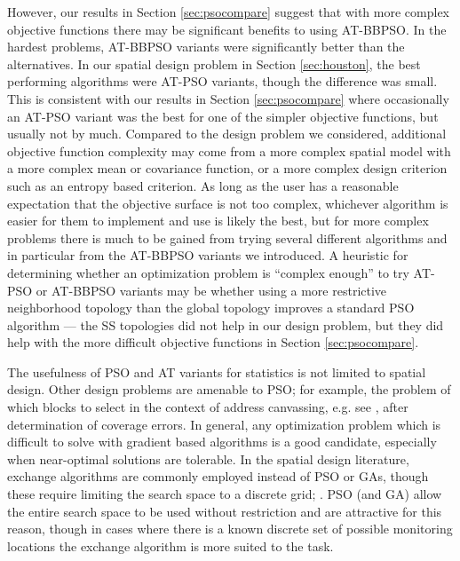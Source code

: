 \documentclass[cmbright]{staauth}
\begin{document}
However, our results in Section \ref{sec:psocompare} suggest that with more complex objective functions there may be significant benefits to using AT-BBPSO. In the hardest problems, AT-BBPSO variants were significantly better than the alternatives. In our spatial design problem in Section \ref{sec:houston}, the best performing algorithms were AT-PSO variants, though the difference was small. This is consistent with our results in Section \ref{sec:psocompare} where occasionally an AT-PSO variant was the best for one of the simpler objective functions, but usually not by much. Compared to the design problem we considered, additional objective function complexity may come from a more complex spatial model with a more complex mean or covariance function, or a more complex design criterion such as an entropy based criterion. As long as the user has a reasonable expectation that the objective surface is not too complex, whichever algorithm is easier for them to implement and use is likely the best, but for more complex problems there is much to be gained from trying several different algorithms and in particular from the AT-BBPSO variants we introduced. A heuristic for determining whether an optimization problem is ``complex enough'' to try AT-PSO or AT-BBPSO variants may be whether using a more restrictive neighborhood topology than the global topology improves a standard PSO algorithm --- the SS topologies did not help in our design problem, but they did help with the more difficult objective functions in Section \ref{sec:psocompare}.

The usefulness of PSO and AT variants for statistics is not limited to spatial design. Other design problems are amenable to PSO; for example, the problem of which blocks to select in the context of address canvassing, e.g. see \cite{young2016zero}, after determination of coverage errors. In general, any optimization problem which is difficult to solve with gradient based algorithms is a good candidate, especially when near-optimal solutions are tolerable. In the spatial design literature, exchange algorithms are commonly employed instead of PSO or GAs, though these require limiting the search space to a discrete grid; \cite{nychka1998design,wikle1999space,wikle2005dynamic}. PSO (and GA) allow the entire search space to be used without restriction and are attractive for this reason, though in cases where there is a known discrete set of possible monitoring locations the exchange algorithm is more suited to the task.




\end{document}

